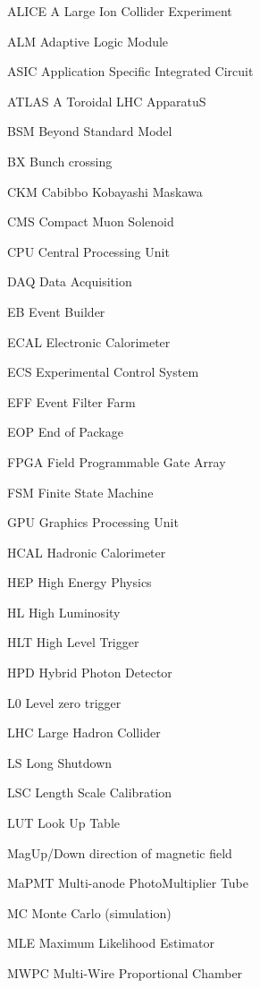 \begin{abbreviations}
    \item[ALICE] A Large Ion Collider Experiment
    \item[ALM] Adaptive Logic Module
    \item[ASIC] Application Specific Integrated Circuit
    \item[ATLAS] A Toroidal LHC ApparatuS
    \item[BSM] Beyond Standard Model
    \item[BX] Bunch crossing
    \item[CKM] Cabibbo Kobayashi Maskawa
    \item[CMS] Compact Muon Solenoid
    \item[CPU] Central Processing Unit
    \item[DAQ] Data Acquisition
    \item[EB] Event Builder
    \item[ECAL] Electronic Calorimeter
    \item[ECS] Experimental Control System
    \item[EFF] Event Filter Farm
    \item[EOP] End of Package
    \item[FPGA] Field Programmable Gate Array
    \item[FSM] Finite State Machine
    \item[GPU] Graphics Processing Unit
    \item[HCAL] Hadronic Calorimeter
    \item[HEP] High Energy Physics
    \item[HL] High Luminosity
    \item[HLT] High Level Trigger
    \item[HPD] Hybrid Photon Detector
    \item[L$0$] Level zero trigger
    \item[LHC] Large Hadron Collider
    \item[LS] Long Shutdown
    \item[LSC] Length Scale Calibration
    \item[LUT] Look Up Table
    \item[MagUp/Down] direction of magnetic field
    \item[MaPMT] Multi-anode PhotoMultiplier Tube
    \item[MC] Monte Carlo (simulation)
    \item[MLE] Maximum Likelihood Estimator
    \item[MWPC] Multi-Wire Proportional Chamber

\end{abbreviations}
